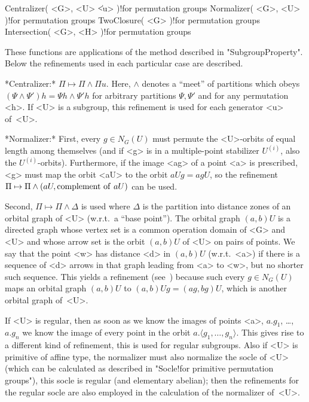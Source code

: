 \>Centralizer( <G>, <U> \| <u> )!{for permutation groups}
\>Normalizer( <G>, <U> )!{for permutation groups}
\>TwoClosure( <G> )!{for permutation groups}
\>Intersection( <G>, <H> )!{for permutation groups}

These functions    are    applications  of  the   method   described   in
"SubgroupProperty". Below the refinements  used  in each particular  case
are described.

\medskip\noindent
*Centralizer:* $\Pi \mapsto \Pi  \wedge \Pi u$.  Here, $\wedge$ denotes a
``meet'' of partitions which obeys $(\Psi \wedge  \Psi')h = \Psi h \wedge
\Psi'h$   for arbitrary partitions $\Psi,\Psi'$   and for any permutation
<h>. If <U> is a subgroup, this refinement is used for each generator <u>
of~<U>.

\medskip\noindent
*Normalizer:*  First, every $g\in N_G(U)$ must  permute the <U>-orbits of
equal  length among   themselves  (and if  <g>   is  in a  multiple-point
stabilizer $U^{(i)}$,  also the   $U^{(i)}$-orbits). Furthermore, if  the
image <ag> of a  point <a> is prescribed, <g>  must map the orbit <aU> to
the orbit $aUg  = agU$, so  the refinement $\Pi  \mapsto \Pi  \wedge (aU,
{\rm complement}\allowbreak\ {\rm of\ }aU)$ can be used.

Second, $\Pi \mapsto \Pi  \wedge \Delta$  is  used where $\Delta$  is the
partition into distance zones of an orbital graph of <U> (w.r.t.~a ``base
point''). The orbital graph $(a,b)U$ is a directed graph whose vertex set
is a common  operation domain of <G> and  <U> and whose  arrow set is the
orbit $(a,b)U$ of <U> on pairs  of points. We say  that the point <w> has
distance  <d> in $(a,b)U$ (w.r.t.~<a>)  if   there is  a sequence of  <d>
arrows in  that  graph  leading from <a>  to  <w>,  but no   shorter such
sequence.  This yields a  refinement (see~\cite{Theissen97}) because such
every $g\in   N_G(U)$  maps an  orbital  graph  $(a,b)U$  to  $(a,b)Ug  =
(ag,bg)U$, which is another orbital graph of~<U>.

If <U> is regular,  then as soon  as we  know  the images of points  <a>,
$a.g_1$, \dots,  $a.g_n$ we know  the image of  every  point in the orbit
$a.\langle  g_1,\ldots,g_n \rangle$. This  gives rise to a different kind
of   refinement, this is    used for regular   subgroups. Also  if <U> is
primitive of affine type, the normalizer must also normalize the socle of
<U>  (which can be     calculated as described  in   "Socle!for primitive
permutation  groups"),  this socle is   regular (and elementary abelian);
then the refinements   for the regular   socle are also  employed in  the
calculation of the normalizer of~<U>.

